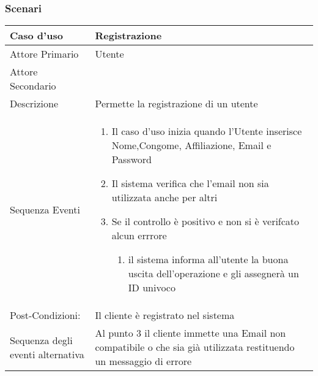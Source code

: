 \subsubsection{Scenari}
\label{sec:scenari}
\begin{tabular}{|p{3cm}|p{7cm}|}
\hline 
\rowcolor{Orchid}
Caso d'uso & Registrazione \\
\hline
Attore Primario & Utente\\
\hline
Attore Secondario & \\
\hline
Descrizione & Permette la registrazione di un utente\\
\hline
  Sequenza Eventi &
                    \begin{enumerate}
                    \item Il caso d'uso inizia quando l'Utente inserisce Nome,Congome, Affiliazione, Email e Password
                    \item Il sistema verifica che l'email non sia utilizzata anche per altri
                    \item Se il controllo è positivo e non si è verifcato alcun errrore
                      \begin{enumerate}
                      \item il sistema informa all'utente la buona uscita dell'operazione e gli assegnerà un ID univoco
                      \end{enumerate}
                    \end{enumerate}\\
\hline
Post-Condizioni: & Il cliente è registrato nel sistema \\
\hline
Sequenza degli eventi alternativa & Al punto 3 il cliente immette una Email non compatibile o che sia già utilizzata restituendo un messaggio di errore\\
\hline
\end{tabular}

